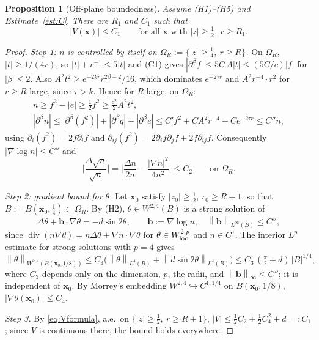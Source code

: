 \documentclass[11pt,a4paper]{article}
\theoremstyle{plain}
\newtheorem{proposition}[theorem]{Proposition}
\theoremstyle{definition}
\theoremstyle{remark}
\newcommand{\norm}[1]{\left\|#1\right\|}
\DeclareMathOperator{\divg}{div}
\begin{document}
\begin{proposition}[Off-plane boundedness]\label{prop:E1}
Assume (H1)--(H5) and Estimate~\ref{est:C}. There are $R_1$ and $C_1$ such that
\[
|V(\mathbf x)|\le C_1\qquad\text{for all }\mathbf x\text{ with }|z|\ge\tfrac12,\ r\ge R_1 .
\]
\end{proposition}

\begin{proof}
\emph{Step 1: $n$ is controlled by itself on $\Omega_R:=\{|z|\ge\tfrac14,\ r\ge R\}$.} On $\Omega_R$, $|t|\ge1/(4r)$, so $|t|+r^{-1}\le5|t|$ and (C1) gives $|\partial^\beta f|\le5C\,A|t|\le(5C/c)|f|$ for $|\beta|\le2$. Also $A^2t^2\ge e^{-2kr}r^{2\beta-2}/16$, which dominates $e^{-2\tau r}$ and $A^2r^{-4}\cdot r^2$ for $r\ge R$ large, since $\tau>k$. Hence for $R$ large, on $\Omega_R$:
\[
\begin{gathered}
n\ge f^2-|e|\ge\tfrac12f^2\ge\tfrac{c^2}{2}A^2t^2,\\
|\partial^\beta n|\le|\partial^\beta(f^2)|+|\partial^\beta q|+|\partial^\beta e|\le C'f^2+CA^2r^{-4}+Ce^{-2\tau r}\le C''n ,
\end{gathered}
\]
using $\partial_i(f^2)=2f\partial_if$ and $\partial_{ij}(f^2)=2\partial_if\partial_jf+2f\partial_{ij}f$. Consequently $|\nabla\log n|\le C''$ and
\[
\Big|\frac{\Delta\sqrt n}{\sqrt n}\Big|=\Big|\frac{\Delta n}{2n}-\frac{|\nabla n|^2}{4n^2}\Big|\le C_2\qquad\text{on }\Omega_R .
\]

\emph{Step 2: gradient bound for $\theta$.} Let $\mathbf x_0$ satisfy $|z_0|\ge\tfrac12$, $r_0\ge R+1$, so that $B:=B(\mathbf x_0,\tfrac14)\subset\Omega_R$. By (H2), $\theta\in W^{2,4}(B)$ is a strong solution of
\[
\Delta\theta+\mathbf b\cdot\nabla\theta=-d\sin2\theta,\qquad \mathbf b:=\nabla\log n,\quad\norm{\mathbf b}_{L^\infty(B)}\le C'' ,
\]
since $\divg(n\nabla\theta)=n\Delta\theta+\nabla n\cdot\nabla\theta$ for $\theta\in W^{2,p}_{\rm loc}$ and $n\in C^1$. The interior $L^p$ estimate for strong solutions \cite[Thm.~9.11]{GT} with $p=4$ gives
\[
\norm\theta_{W^{2,4}(B(\mathbf x_0,1/8))}\le C_3\Big(\norm\theta_{L^4(B)}+\norm{d\sin2\theta}_{L^4(B)}\Big)\le C_3\,(\tfrac\pi2+d)\,|B|^{1/4},
\]
where $C_3$ depends only on the dimension, $p$, the radii, and $\norm{\mathbf b}_\infty\le C''$; it is independent of $\mathbf x_0$. By Morrey's embedding $W^{2,4}\hookrightarrow C^{1,1/4}$ on $B(\mathbf x_0,1/8)$, $|\nabla\theta(\mathbf x_0)|\le C_4$.

\emph{Step 3.} By \eqref{eq:Vformula}, a.e.\ on $\{|z|\ge\tfrac12,\ r\ge R+1\}$, $|V|\le\tfrac12C_2+\tfrac12C_4^2+d=:C_1$; since $V$ is continuous there, the bound holds everywhere.
\end{proof}
\end{document}
